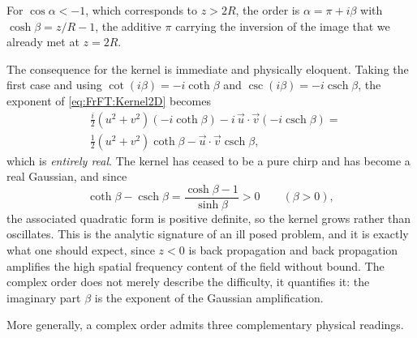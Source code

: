 			For $\cos\alpha < -1$, which corresponds to $z>2R$, the order is $\alpha = \pi + i\beta$ with $\cosh\beta = z/R - 1$, the additive $\pi$ carrying the inversion of the image that we already met at $z=2R$.

			The consequence for the kernel is immediate and physically eloquent. Taking the first case and using $\cot(i\beta) = -i\coth\beta$ and $\csc(i\beta) = -i\operatorname{csch}\beta$, the exponent of \eqref{eq:FrFT:Kernel2D} becomes
			\begin{align*}
				& \frac{i}{2}\left(u^{2}+v^{2}\right)\left(-i\coth\beta\right) - i\,\vec{u}\cdot\vec{v}\left(-i\operatorname{csch}\beta\right) = \\
				& \frac{1}{2}\left(u^{2}+v^{2}\right)\coth\beta - \vec{u}\cdot\vec{v}\operatorname{csch}\beta,
			\end{align*}
			which is \textit{entirely real}. The kernel has ceased to be a pure chirp and has become a real Gaussian, and since
			\begin{equation*}
				\coth\beta - \operatorname{csch}\beta = \frac{\cosh\beta - 1}{\sinh\beta} > 0 \qquad (\beta>0),
			\end{equation*}
			the associated quadratic form is positive definite, so the kernel grows rather than oscillates. This is the analytic signature of an ill posed problem, and it is exactly what one should expect, since $z<0$ is back propagation and back propagation amplifies the high spatial frequency content of the field without bound. The complex order does not merely describe the difficulty, it quantifies it: the imaginary part $\beta$ is the exponent of the Gaussian amplification.

			More generally, a complex order admits three complementary physical readings.

